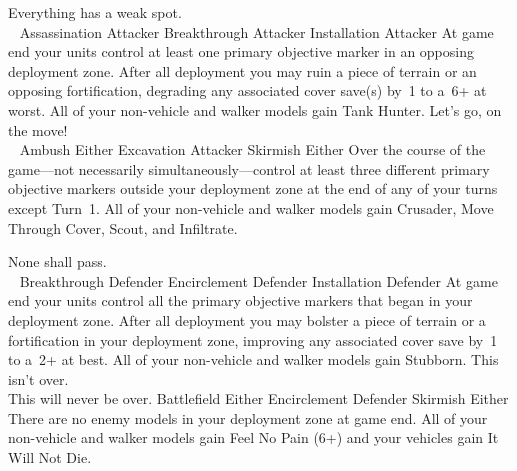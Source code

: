 \noindent%
%
{Everything has a weak spot.\\~}%
{Assassination}%
{Attacker}%
{Breakthrough}%
{Attacker}%
{Installation}%
{Attacker}%
{At game end your units control at least one primary objective marker
  in an opposing deployment zone.}%
{After all deployment you may ruin a piece of terrain or an opposing
  fortification, degrading any associated cover save(s) by~1 to a~6+
  at worst.  All of your non-vehicle and walker models gain Tank
  Hunter.}
\hfill
%
{Let's go, on the move!\\~}%
{Ambush}%
{Either}%
{Excavation}%
{Attacker}%
{Skirmish}%
{Either}%
{Over the course of the game---not necessarily
  simultaneously---control at least three different primary objective
  markers outside your deployment zone at the end of any of your turns
  except Turn~1.}%
%
{All of your non-vehicle and walker models gain Crusader, Move Through
  Cover, Scout, and Infiltrate.}

\vfill


\noindent%
%
{None shall pass.\\~}%
{Breakthrough}%
{Defender}%
{Encirclement}%
{Defender}%
{Installation}%
{Defender}%
{At game end your units control all the primary objective markers that
  began in your deployment zone.}%
{After all deployment you may bolster a piece of terrain or a
  fortification in your deployment zone, improving any associated
  cover save by~1 to a~2+ at best.  All of your non-vehicle and walker
  models gain Stubborn.}
\hfill
%
{This isn't over.\\This will never be over.}%
{Battlefield}%
{Either}%
{Encirclement}%
{Defender}%
{Skirmish}%
{Either}%
{There are no enemy models in your deployment zone at
  game end.}%
{All of your non-vehicle and walker models gain Feel No Pain (6+) and
  your vehicles gain It Will Not Die.}


\clearpage
\restorebackground
